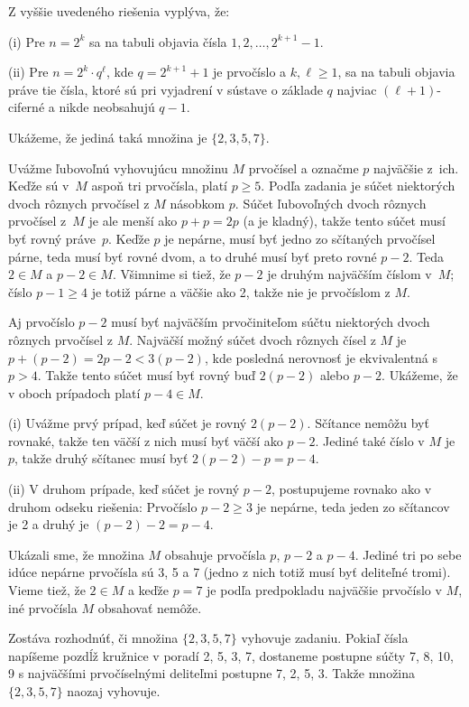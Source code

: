 {\poznamka
Z vyššie uvedeného riešenia vyplýva, že:

\smallskip
\item{(i)} Pre $n=2^k$ sa na tabuli objavia čísla $1,2,\ldots,2^{k+1}-1$.
\item{(ii)} Pre $n = 2^k\cdot q^\ell$, kde $q=2^{k+1} + 1$ je prvočíslo a $k,\ell\ge 1$, sa na tabuli objavia práve tie čísla, ktoré sú pri vyjadrení v sústave o základe $q$ najviac $(\ell+1)$-ciferné a nikde neobsahujú  $q-1$.
}

{%
Ukážeme, že jediná taká množina je $\{2,3,5,7\}$.

Uvážme ľubovoľnú vyhovujúcu množinu $M$ prvočísel a označme $p$ najväčšie z~ich. Keďže sú v~$M$ aspoň tri prvočísla, platí $p\ge 5$.
Podľa zadania je súčet niektorých dvoch rôznych prvočísel z $M$ násobkom $p$.
Súčet ľubovoľných dvoch rôznych prvočísel z~$M$ je ale menší ako $p+p=2p$ (a je kladný), takže tento súčet musí byť rovný práve~$p$. Keďže $p$ je nepárne, musí byť jedno zo sčítaných prvočísel párne, teda musí byť rovné dvom, a to druhé musí byť preto rovné $p-2$. Teda $2\in M$ a $p-2\in M$. Všimnime si tiež, že $p-2$ je druhým najväčším číslom v~$M$; číslo $p-1\ge 4$ je totiž párne a väčšie ako 2, takže nie je prvočíslom z $M$.

Aj prvočíslo $p-2$ musí byť najväčším prvočiniteľom súčtu niektorých dvoch rôznych prvočísel z $M$.
Najväčší možný súčet dvoch rôznych čísel z $M$ je $p+(p-2)=2p-2<3(p-2)$, kde posledná nerovnosť je ekvivalentná s $p>4$.
Takže tento súčet musí byť rovný buď $2(p-2)$ alebo $p-2$.
Ukážeme, že v oboch prípadoch platí $p-4\in M$.

\smallskip
\item{(i)} Uvážme prvý prípad, keď súčet je rovný $2(p-2)$. Sčítance nemôžu byť rovnaké, takže ten väčší z nich musí byť väčší ako $p-2$. Jediné také číslo v $M$ je $p$, takže druhý sčítanec musí byť $2(p-2)-p=p-4$.
\item{(ii)} V druhom prípade, keď súčet je rovný $p-2$, postupujeme rovnako ako v druhom odseku riešenia: Prvočíslo $p-2\ge 3$ je nepárne, teda jeden zo sčítancov je 2 a druhý je $(p-2)-2=p-4$.

\smallskip\noindent
Ukázali sme, že množina $M$ obsahuje prvočísla $p$, $p-2$ a $p-4$.
Jediné tri po sebe idúce nepárne prvočísla sú 3, 5 a 7 (jedno z nich totiž musí byť deliteľné tromi). Vieme tiež, že $2\in M$ a keďže $p=7$ je podľa predpokladu najväčšie prvočíslo v $M$, iné prvočísla $M$ obsahovať nemôže.

Zostáva rozhodnúť, či množina $\{2,3,5,7\}$ vyhovuje zadaniu. Pokiaľ čísla napíšeme pozdĺž kružnice v poradí 2, 5, 3, 7, dostaneme postupne súčty 7, 8, 10, 9 s najväčšími prvočíselnými deliteľmi postupne 7, 2, 5, 3. Takže množina $\{2,3,5,7\}$ naozaj vyhovuje.
}

